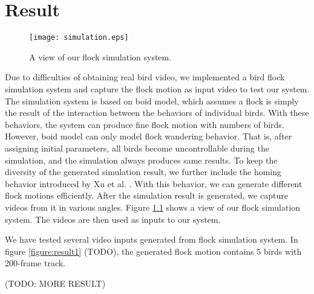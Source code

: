 \chapter{Result}


\begin{figure}[h]
 \begin{center}
  \texttt{[image: simulation.eps]}
 \end{center}
 \caption{A view of our flock simulation system.}
 \label{figure:simulation}
\end{figure}


Due to difficulties of obtaining real bird video, we implemented a bird flock simulation system and capture the flock motion as input video to test our system. The simulation system is based on boid model, which assumes a flock is simply the result of the interaction between the behaviors of individual birds. With these behaviors, the system can produce fine flock motion with numbers of birds. However, boid model can only model flock wandering behavior. That is, after assigning initial parameters, all birds become uncontrollable during the simulation, and the simulation always produces same results. To keep the diversity of the generated simulation result, we further include the homing behavior introduced by Xu et al. \cite{Shape}. With this behavior, we can generate different flock motions efficiently. After the simulation result is generated, we capture videos from it in various angles. Figure \ref{figure:simulation} shows a view of our flock simulation system. The videos are then used as inputs to our system.


We have tested several video inputs generated from flock simulation system. In figure \ref{figure:result1} (TODO), the generated flock motion contains 5 birds with 200-frame track.


(TODO: MORE RESULT)
